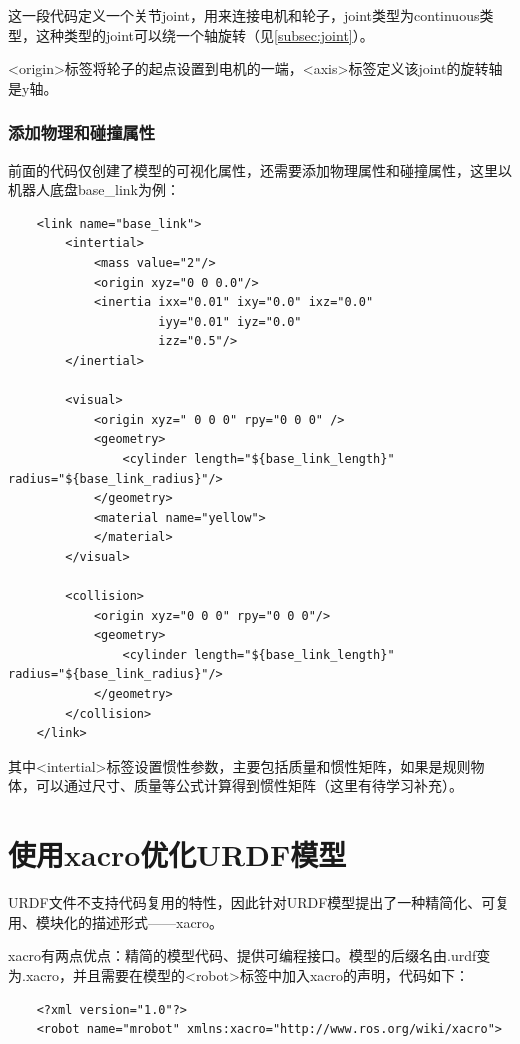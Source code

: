 \documentclass[10pt, oneside]{book}
\begin{document}
这一段代码定义一个关节joint，用来连接电机和轮子，joint类型为continuous类型，这种类型的joint可以绕一个轴旋转（见\autoref{subsec:joint}）。

<origin>标签将轮子的起点设置到电机的一端，<axis>标签定义该joint的旋转轴是y轴。

\subsubsection{添加物理和碰撞属性}

前面的代码仅创建了模型的可视化属性，还需要添加物理属性和碰撞属性，这里以机器人底盘base\_link为例：

\begin{verbatim}
    <link name="base_link">
        <intertial>
            <mass value="2"/>
            <origin xyz="0 0 0.0"/>
            <inertia ixx="0.01" ixy="0.0" ixz="0.0"
                     iyy="0.01" iyz="0.0" 
                     izz="0.5"/>
        </inertial>

        <visual>
            <origin xyz=" 0 0 0" rpy="0 0 0" />
            <geometry>
                <cylinder length="${base_link_length}" radius="${base_link_radius}"/>
            </geometry>
            <material name="yellow">
            </material>
        </visual>

        <collision>
            <origin xyz="0 0 0" rpy="0 0 0"/>
            <geometry>
                <cylinder length="${base_link_length}" radius="${base_link_radius}"/>
            </geometry>
        </collision>
    </link>
\end{verbatim}

其中<intertial>标签设置惯性参数，主要包括质量和惯性矩阵，如果是规则物体，可以通过尺寸、质量等公式计算得到惯性矩阵（这里有待学习补充）。

\section{使用xacro优化URDF模型}

URDF文件不支持代码复用的特性，因此针对URDF模型提出了一种精简化、可复用、模块化的描述形式——xacro。

xacro有两点优点：精简的模型代码、提供可编程接口。模型的后缀名由.urdf变为.xacro，并且需要在模型的<robot>标签中加入xacro的声明，代码如下：

\begin{verbatim}
    <?xml version="1.0"?>
    <robot name="mrobot" xmlns:xacro="http://www.ros.org/wiki/xacro">
\end{verbatim}
\end{document}
